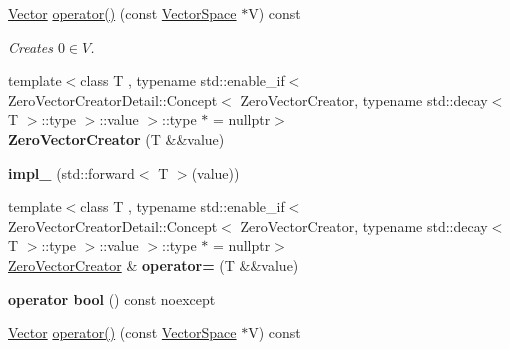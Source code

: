 \begin{DoxyCompactItemize}
\item 
\hypertarget{classSpacy_1_1ZeroVectorCreator_afb20329c56ee527505ef7390eba96870}{\hyperlink{classSpacy_1_1Vector}{Vector} \hyperlink{classSpacy_1_1ZeroVectorCreator_afb20329c56ee527505ef7390eba96870}{operator()} (const \hyperlink{classSpacy_1_1VectorSpace}{Vector\-Space} $\ast$V) const }\label{classSpacy_1_1ZeroVectorCreator_afb20329c56ee527505ef7390eba96870}

\begin{DoxyCompactList}\small\item\em Creates $ 0 \in V $. \end{DoxyCompactList}\item 
\hypertarget{classSpacy_1_1ZeroVectorCreator_aa33a8160098d48aa6034497665eaa084}{{\footnotesize template$<$class T , typename std\-::enable\-\_\-if$<$ Zero\-Vector\-Creator\-Detail\-::\-Concept$<$ Zero\-Vector\-Creator, typename std\-::decay$<$ T $>$\-::type $>$\-::value $>$\-::type $\ast$  = nullptr$>$ }\\{\bfseries Zero\-Vector\-Creator} (T \&\&value)}\label{classSpacy_1_1ZeroVectorCreator_aa33a8160098d48aa6034497665eaa084}

\item 
\hypertarget{classSpacy_1_1ZeroVectorCreator_afd8c08e385def67aaf659572dd256be7}{{\bfseries impl\-\_\-} (std\-::forward$<$ T $>$(value))}\label{classSpacy_1_1ZeroVectorCreator_afd8c08e385def67aaf659572dd256be7}

\item 
\hypertarget{classSpacy_1_1ZeroVectorCreator_a6bf1e05757880d3fdd6a1c481237d0a1}{{\footnotesize template$<$class T , typename std\-::enable\-\_\-if$<$ Zero\-Vector\-Creator\-Detail\-::\-Concept$<$ Zero\-Vector\-Creator, typename std\-::decay$<$ T $>$\-::type $>$\-::value $>$\-::type $\ast$  = nullptr$>$ }\\\hyperlink{classSpacy_1_1ZeroVectorCreator}{Zero\-Vector\-Creator} \& {\bfseries operator=} (T \&\&value)}\label{classSpacy_1_1ZeroVectorCreator_a6bf1e05757880d3fdd6a1c481237d0a1}

\item 
\hypertarget{classSpacy_1_1ZeroVectorCreator_a2a716f5d88147abcdf73e834ec349c06}{{\bfseries operator bool} () const noexcept}\label{classSpacy_1_1ZeroVectorCreator_a2a716f5d88147abcdf73e834ec349c06}

\item 
\hypertarget{classSpacy_1_1ZeroVectorCreator_afb20329c56ee527505ef7390eba96870}{\hyperlink{classSpacy_1_1Vector}{Vector} \hyperlink{classSpacy_1_1ZeroVectorCreator_afb20329c56ee527505ef7390eba96870}{operator()} (const \hyperlink{classSpacy_1_1VectorSpace}{Vector\-Space} $\ast$V) const }\label{classSpacy_1_1ZeroVectorCreator_afb20329c56ee527505ef7390eba96870}


\end{DoxyCompactItemize}
